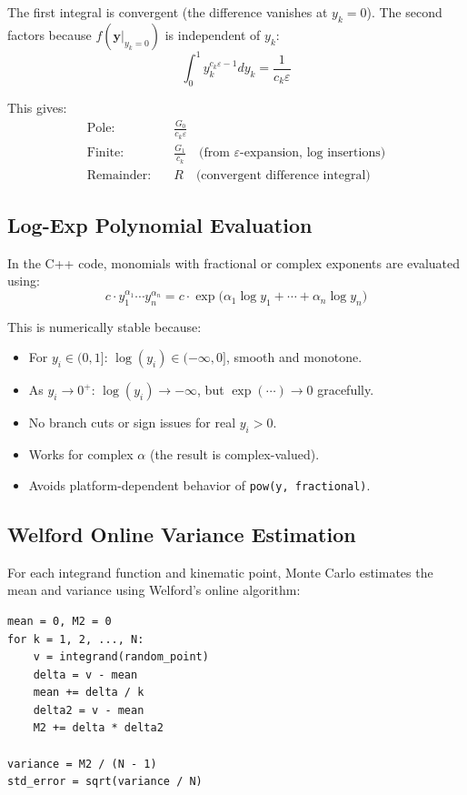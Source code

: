 \documentclass[11pt,a4paper]{article}
\begin{document}
The first integral is convergent (the difference vanishes at $y_k = 0$). The second factors because $f(\mathbf{y}|_{y_k=0})$ is independent of $y_k$:
\begin{equation}
\int_0^1 y_k^{c_k\varepsilon - 1} dy_k = \frac{1}{c_k \varepsilon}
\end{equation}

This gives:
\begin{align}
\text{Pole:} & \quad \frac{G_0}{c_k \varepsilon} \\
\text{Finite:} & \quad \frac{G_1}{c_k} \quad \text{(from $\varepsilon$-expansion, log insertions)} \\
\text{Remainder:} & \quad R \quad \text{(convergent difference integral)}
\end{align}

\subsection{Log-Exp Polynomial Evaluation}

In the C++ code, monomials with fractional or complex exponents are evaluated using:
\begin{equation}
c \cdot y_1^{\alpha_1} \cdots y_n^{\alpha_n} = c \cdot \exp\!\bigl(\alpha_1 \log y_1 + \cdots + \alpha_n \log y_n\bigr)
\end{equation}

This is numerically stable because:
\begin{itemize}
  \item For $y_i \in (0,1]$: $\log(y_i) \in (-\infty, 0]$, smooth and monotone.
  \item As $y_i \to 0^+$: $\log(y_i) \to -\infty$, but $\exp(\cdots) \to 0$ gracefully.
  \item No branch cuts or sign issues for real $y_i > 0$.
  \item Works for complex $\alpha$ (the result is complex-valued).
  \item Avoids platform-dependent behavior of \texttt{pow(y, fractional)}.
\end{itemize}

\subsection{Welford Online Variance Estimation}

For each integrand function and kinematic point, Monte Carlo estimates the mean and variance using Welford's online algorithm:
\begin{lstlisting}
mean = 0, M2 = 0
for k = 1, 2, ..., N:
    v = integrand(random_point)
    delta = v - mean
    mean += delta / k
    delta2 = v - mean
    M2 += delta * delta2

variance = M2 / (N - 1)
std_error = sqrt(variance / N)
\end{lstlisting}
\end{document}
